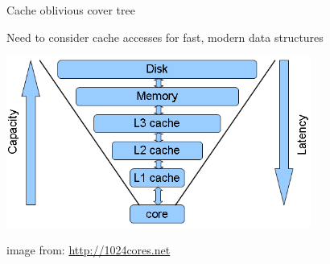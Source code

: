 \begin{frame}[fragile]{Cache oblivious cover tree}

%
Need to consider cache accesses for fast, modern data structures

%
\begin{center}
\includegraphics[width=10cm]{slides/cpu_cache_structure}
\end{center}

{\tiny image from: \url{http://1024cores.net} }
\end{frame}


